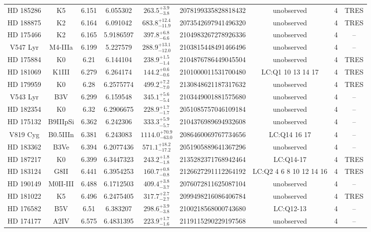 \begin{table*}
\begin{tabular}{ccccccccc}
HD 185286 & K5 & 6.151 & 6.055302 & $263.5^{+3.9}_{-3.8}$ & 2078199335828818432 & unobserved & 4 & TRES \\
HD 188875 & K2 & 6.164 & 6.091042 & $683.8^{+12.4}_{-11.9}$ & 2073542697941496320 & unobserved & 4 & TRES \\
HD 175466 & K2 & 6.165 & 5.9186597 & $397.8^{+6.8}_{-6.6}$ & 2104983267278926336 & unobserved & 4 & -- \\
V547 Lyr & M4-IIIa & 6.199 & 5.227579 & $288.9^{+13.1}_{-12.0}$ & 2103815448491466496 & unobserved & 4 & -- \\
HD 175884 & K0 & 6.21 & 6.144104 & $238.9^{+1.5}_{-1.4}$ & 2104876786449045504 & unobserved & 4 & TRES \\
HD 181069 & K1III & 6.279 & 6.264174 & $144.2^{+0.6}_{-0.6}$ & 2101000011531700480 & LC:Q1 10 13 14 17 & 4 & TRES \\
HD 179959 & K0 & 6.28 & 6.2575774 & $499.2^{+7.2}_{-7.0}$ & 2130848621187317632 & unobserved & 4 & TRES \\
V543 Lyr & B3V & 6.299 & 6.159548 & $345.1^{+5.6}_{-5.4}$ & 2103449001881575680 & unobserved & 4 & -- \\
HD 182354 & K0 & 6.32 & 6.2906675 & $228.9^{+1.7}_{-1.7}$ & 2051085757046109184 & unobserved & 4 & -- \\
HD 175132 & B9IIIpSi & 6.362 & 6.242306 & $333.3^{+5.9}_{-5.7}$ & 2104376989694932608 & unobserved & 4 & -- \\
V819 Cyg & B0.5IIIn & 6.381 & 6.243083 & $1114.0^{+70.9}_{-63.0}$ & 2086460069767734656 & LC:Q14 16 17 & 4 & -- \\
HD 183362 & B3Ve & 6.394 & 6.2077436 & $571.1^{+18.2}_{-17.2}$ & 2051905889641367296 & unobserved & 4 & -- \\
HD 187217 & K0 & 6.399 & 6.3447323 & $243.2^{+1.8}_{-1.8}$ & 2135282371768942464 & LC:Q14-17 & 4 & TRES \\
HD 183124 & G8II & 6.441 & 6.3954253 & $160.7^{+0.8}_{-0.8}$ & 2126627291112264192 & LC:Q2 4 6 8 10 12 14 16 & 4 & TRES \\
HD 190149 & M0II-III & 6.488 & 6.1712503 & $409.4^{+3.8}_{-3.7}$ & 2076072811625087104 & unobserved & 4 & -- \\
HD 181022 & K5 & 6.496 & 6.2475405 & $317.7^{+2.7}_{-2.7}$ & 2099498216086406784 & unobserved & 4 & TRES \\
HD 176582 & B5V & 6.51 & 6.383207 & $298.6^{+3.9}_{-3.8}$ & 2100218568000743680 & LC:Q12-13 & 4 & -- \\
HD 174177 & A2IV & 6.575 & 6.4831395 & $223.9^{+1.7}_{-1.6}$ & 2119115290229197568 & unobserved & 4 & -- \\

\end{tabular}
\end{table*}
